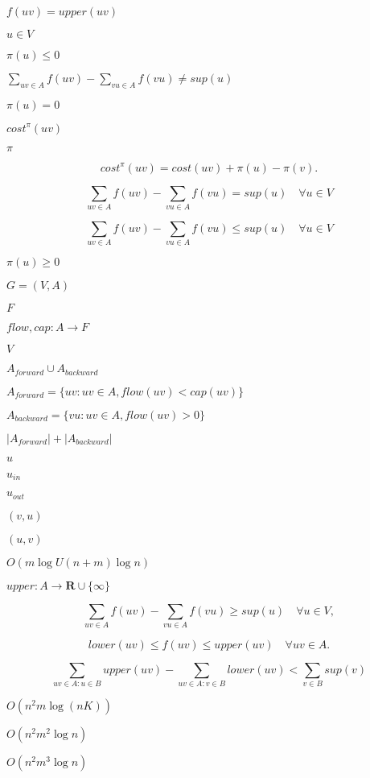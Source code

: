 \documentclass{article}
\begin{document}
$f(uv)=upper(uv)$
\pagebreak

$u\in V$
\pagebreak

$\pi(u)\leq 0$
\pagebreak

$\sum_{uv\in A} f(uv) - \sum_{vu\in A} f(vu) \neq sup(u)$
\pagebreak

$\pi(u)=0$
\pagebreak

$cost^\pi(uv)$
\pagebreak

$\pi$
\pagebreak

\[ cost^\pi(uv) = cost(uv) + \pi(u) - \pi(v).\]
\pagebreak

\[ \sum_{uv\in A} f(uv) - \sum_{vu\in A} f(vu) = sup(u) \quad \forall u\in V \]
\pagebreak

\[ \sum_{uv\in A} f(uv) - \sum_{vu\in A} f(vu) \leq sup(u) \quad \forall u\in V \]
\pagebreak

$\pi(u)\geq 0$
\pagebreak

$ G=(V, A) $
\pagebreak

$ F $
\pagebreak

$ flow, cap: A\to F $
\pagebreak

$ V $
\pagebreak

$ A_{forward}\cup A_{backward} $
\pagebreak

$ A_{forward}=\{uv : uv\in A, flow(uv)<cap(uv)\} $
\pagebreak

$ A_{backward}=\{vu : uv\in A, flow(uv)>0\} $
\pagebreak

$ |A_{forward}| + |A_{backward}|$
\pagebreak

$ u $
\pagebreak

$ u_{in} $
\pagebreak

$ u_{out} $
\pagebreak

$ (v, u) $
\pagebreak

$ (u, v) $
\pagebreak

$O(m\log U (n+m)\log n)$
\pagebreak

$upper: A\rightarrow\mathbf{R}\cup\{\infty\}$
\pagebreak

\[ \sum_{uv\in A} f(uv) - \sum_{vu\in A} f(vu) \geq sup(u) \quad \forall u\in V, \]
\pagebreak

\[ lower(uv) \leq f(uv) \leq upper(uv) \quad \forall uv\in A. \]
\pagebreak

\[ \sum_{uv\in A: u\in B} upper(uv) - \sum_{uv\in A: v\in B} lower(uv) < \sum_{v\in B} sup(v) \]
\pagebreak

$O(n^2m\log(nK))$
\pagebreak

$O(n^2 m^2 \log n)$
\pagebreak

$O(n^2 m^3 \log n)$
\pagebreak
\end{document}
